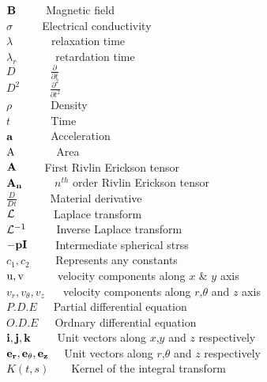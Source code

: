 ${\bf B}\,\,\,\,\,\,\,\,\,\,\,\,\,\,\,\,$Magnetic field\\
${\sigma}\,\,\,\,\,\,\,\,\,\,\,\,\,\,\,\,$Electrical conductivity\\
${\lambda}\,\,\,\,\,\,\,\,\,\,\,\,\,\,\,\,\,\,\,\,\,$relaxation time\\
${\lambda_{r} }\,\,\,\,\,\,\,\,\,\,\,\,\,\,\,\,\,\,\,\,\,$retardation time\\
${{D}}\,\,\,\,\,\,\,\,\,\,\,\,\,\,\,\,\,\,\,\frac{\partial }{{\partial t}}$\\
${{{D}}^2}\,\,\,\,\,\,\,\,\,\,\,\,\,\,\,\,\frac{\partial^2 }{{\partial {t^2}}}$\\
$\rho \,\,\,\,\,\,\,\,\,\,\,\,\,\,\,\,\,\,\,\,\,$Density\\
$t\,\,\,\,\,\,\,\,\,\,\,\,\,\,\,\,\,\,\,\,\,\,$Time\\
${\bf{a}}\,\,\,\,\,\,\,\,\,\,\,\,\,\,\,\,\,\,\,\,$Acceleration\\
$\rm A\,\,\,\,\,\,\,\,\,\,\,\,\,\,\,\,\,\,\,\,\,\,$Area\\
${{\bf{A}}}\,\,\,\,\,\,\,\,\,\,\,\,\,\,\,$First Rivlin Erickson tensor\\
${{\bf{A}_n}}\,\,\,\,\,\,\,\,\,\,\,\,\,\,\,$ $n^{th}$ order Rivlin Erickson tensor\\
$\frac{D}{{Dt}}\,\,\,\,\,\,\,\,\,\,\,\,\,\,\,\,\,\,$Material derivative\\
${\cal L}\,\,\,\,\,\,\,\,\,\,\,\,\,\,\,\,\,\,\,\,\,$Laplace transform\\
${{\cal L}^{ - 1}}\,\,\,\,\,\,\,\,\,\,\,\,\,\,\,\,$Inverse Laplace transform\\
${\bf{ - pI}}\,\,\,\,\,\,\,\,\,\,\,\,\,\,\,$Intermediate spherical strss\\
${c_1},{c_2}\,\,\,\,\,\,\,\,\,\,\,\,\,\,$Represents any constants\\
$\rm {u,v}\,\,\,\,\,\,\,\,\,\,\,\,\,\,\,\,\,\,$velocity components along $x$ \& $y$ axis\\
${v_r},{v_\theta },{v_z}\,\,\,\,\,\,\,\,\,\,$velocity components along $r$,$\theta$ and $z$ axis\\
${{P}}.{{D}}.{{E}}\,\,\,\,\,\,\,\,\,$Partial differential equation\\
${{O}}.{{D}}.{{E}}\,\,\,\,\,\,\,\,\,$Ordnary differential equation\\
${\bf{i,j,k}}\,\,\,\,\,\,\,\,\,\,\,\,\,\,$Unit vectors along $x$,$y$ and $z$ respectively\\
${\bf{{e_r},{e_\theta },{e_z}}}\,\,\,\,\,\,\,\,$Unit vectors along $r$,$\theta$ and $z$ respectively\\
$K(t,s)\,\,\,\,\,\,\,\,\,\,\,\,$Kernel of the integral transform\\


